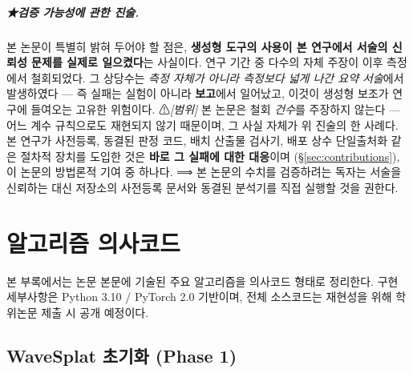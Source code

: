 \documentclass[11pt]{report}
\numberwithin{equation}{chapter}
\numberwithin{figure}{chapter}
\numberwithin{table}{chapter}
\begin{document}
\paragraph{★검증 가능성에 관한 진술.}
본 논문이 특별히 밝혀 두어야 할 점은, \textbf{생성형 도구의 사용이 본 연구에서
서술의 신뢰성 문제를 실제로 일으켰다}는 사실이다.
연구 기간 중 다수의 자체 주장이 이후 측정에서 철회되었다. 그 상당수는
\emph{측정 자체가 아니라 측정보다 넓게 나간 요약 서술}에서 발생하였다 ---
즉 실패는 실험이 아니라 \textbf{보고}에서 일어났고, 이것이 생성형 보조가
연구에 들여오는 고유한 위험이다.
⚠\emph{[범위]} 본 논문은 철회 \emph{건수}를 주장하지 않는다 --- 어느 계수 규칙으로도
재현되지 않기 때문이며, 그 사실 자체가 위 진술의 한 사례다.
본 연구가 사전등록, 동결된 판정 코드, 배치 산출물 검사기, 배포 상수 단일출처화 같은
절차적 장치를 도입한 것은 \textbf{바로 그 실패에 대한 대응}이며
(\S\ref{sec:contributions}), 이 논문의 방법론적 기여 중 하나다.
⟹ 본 논문의 수치를 검증하려는 독자는 서술을 신뢰하는 대신
저장소의 사전등록 문서와 동결된 분석기를 직접 실행할 것을 권한다.

\appendix

\chapter{알고리즘 의사코드}
\label{app:algorithms}

본 부록에서는 논문 본문에 기술된 주요 알고리즘을 의사코드 형태로 정리한다.
구현 세부사항은 Python 3.10 / PyTorch 2.0 기반이며,
전체 소스코드는 재현성을 위해 학위논문 제출 시 공개 예정이다.

\section{WaveSplat 초기화 (Phase 1)}
\label{app:alg_init}
\end{document}
